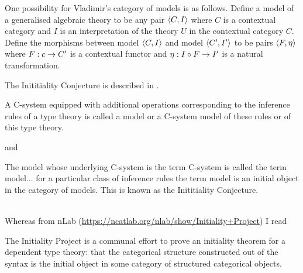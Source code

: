 \begin{oldtt}
\note
One possibility for Vladimir's category of models is as follows. Define a model of a generalised algebraic theory to be any pair $\langle C,I\rangle$ where $C$ is a contextual category and $I$ is an interpretation of the theory $U$ in the contextual category $C$. Define the morphisms between
model $\langle C,I\rangle$ and model $\langle C',I'\rangle$ to be pairs $\langle F, \eta\rangle$ where
$F: c \rightarrow C'$ is a contextual functor and $\eta: I \circ F \rightarrow  I'$ is a natural transformation.
\end{oldtt}

\note The Inititiality Conjecture is described in \cite{VoevodskyInitialityConjecture}.
\begin{tightquote}
A C-system equipped with additional
operations corresponding to the inference rules of a type theory is called a
model or a C-system model of these rules or of this type theory.
\end{tightquote}
and
\begin{tightquote}
The model whose underlying
C-system is the term C-system is called the term model... for a particular
class of inference rules the term model is an initial object in the category of models.
This is known as the Inititiality Conjecture.
\end{tightquote} 
\ \\
\note Whereas from nLab (\url{https://ncatlab.org/nlab/show/Initiality+Project}) I read
\begin{tightquote}
The Initiality Project is a communal effort to prove an initiality theorem for a dependent type theory: that the categorical structure constructed out of the syntax is the initial object in some category of structured categorical objects.
\end{tightquote}

